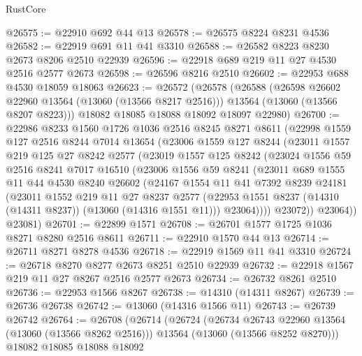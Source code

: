 \begin{lexlean}{RustCore}
\begin{coremodule}
@26575 := @22910 @692 @44 @13
@26578 := @26575 @8224 @8231 @4536
@26582 := @22919 @691 @11 @41 @3310
@26588 := @26582 @8223 @8230 @2673 @8206 @2510 @22939
@26596 := @22918 @689 @219 @11 @27 @4530 @2516 @2577 @2673
@26598 := @26596 @8216 @2510
@26602 := @22953 @688 @4530 @18059 @18063
@26623 := @26572
    (@26578
      (@26588
        (@26598 @26602 @22960 @13564 (@13060 (@13566 @8217 @2516)))
        @13564
        (@13060 (@13566 @8207 @8223)))
      @18082
      @18085
      @18088
      @18092
      @18097
      @22980)
@26700 := @22986
    @8233
    @1560
    @1726
    @1036
    @2516
    @8245
    @8271
    @8611
    (@22998
      @1559
      @127
      @2516
      @8244
      @7014
      @13654
      (@23006
        @1559
        @127
        @8244
        (@23011
          @1557
          @219
          @125
          @27
          @8242
          @2577
          (@23019
            @1557
            @125
            @8242
            (@23024
              @1556
              @59
              @2516
              @8241
              @7017
              @16510
              (@23006
                @1556
                @59
                @8241
                (@23011
                  @689
                  @1555
                  @11
                  @44
                  @4530
                  @8240
                  @26602
                  (@24167
                    @1554
                    @11
                    @41
                    @7392
                    @8239
                    @24181
                    (@23011
                      @1552
                      @219
                      @11
                      @27
                      @8237
                      @2577
                      (@22953 @1551 @8237 (@14310 (@14311 @8237)) (@13060 (@14316 @1551 @11)))
                      @23064))))
              @23072))
          @23064))
      @23081)
@26701 := @22899 @1571
@26708 := @26701 @1577 @1725 @1036 @8271 @8280 @2516 @8611
@26711 := @22910 @1570 @44 @13
@26714 := @26711 @8271 @8278 @4536
@26718 := @22919 @1569 @11 @41 @3310
@26724 := @26718 @8270 @8277 @2673 @8251 @2510 @22939
@26732 := @22918 @1567 @219 @11 @27 @8267 @2516 @2577 @2673
@26734 := @26732 @8261 @2510
@26736 := @22953 @1566 @8267
@26738 := @14310 (@14311 @8267)
@26739 := @26736 @26738
@26742 := @13060 (@14316 @1566 @11)
@26743 := @26739 @26742
@26764 := @26708
    (@26714
      (@26724
        (@26734 @26743 @22960 @13564 (@13060 (@13566 @8262 @2516)))
        @13564
        (@13060 (@13566 @8252 @8270)))
      @18082
      @18085
      @18088
      @18092

\end{coremodule}
\end{lexlean}
